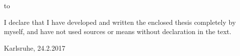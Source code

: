 \thispagestyle{empty}
\vspace*{42\baselineskip}
\hbox to \textwidth{\hrulefill}
\par
I declare that I have developed and written the enclosed thesis completely by myself, and
have not used sources or means without declaration in the text.

Karlsruhe, 24.2.2017

\clearpage






